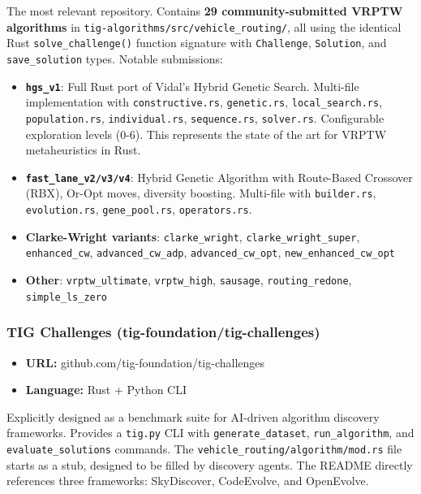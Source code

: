 \documentclass[twocolumn,10pt,letterpaper]{article}
\begin{document}
The most relevant repository. Contains \textbf{29 community-submitted VRPTW algorithms} in \texttt{tig-\allowbreak algorithms/\allowbreak src/\allowbreak vehicle\_routing/\allowbreak }, all using the identical Rust \texttt{solve\_challenge()} function signature with \texttt{Challenge}, \texttt{Solution}, and \texttt{save\_solution} types. Notable submissions:


\begin{itemize}
\setlength{\itemsep}{0pt}
\setlength{\parskip}{0pt}
  \item \textbf{\texttt{hgs\_v1}}: Full Rust port of Vidal's Hybrid Genetic Search. Multi-file implementation with \texttt{constructive.rs}, \texttt{genetic.rs}, \texttt{local\_search.rs}, \texttt{population.rs}, \texttt{individual.rs}, \texttt{sequence.rs}, \texttt{solver.rs}. Configurable exploration levels (0-6). This represents the state of the art for VRPTW metaheuristics in Rust.
  \item \textbf{\texttt{fast\_lane\_v2/\allowbreak v3/\allowbreak v4}}: Hybrid Genetic Algorithm with Route-Based Crossover (RBX), Or-Opt moves, diversity boosting. Multi-file with \texttt{builder.rs}, \texttt{evolution.rs}, \texttt{gene\_pool.rs}, \texttt{operators.rs}.
  \item \textbf{Clarke-Wright variants}: \texttt{clarke\_wright}, \texttt{clarke\_wright\_super}, \texttt{enhanced\_cw}, \texttt{advanced\_cw\_adp}, \texttt{advanced\_cw\_opt}, \texttt{new\_enhanced\_cw\_opt}
  \item \textbf{Other}: \texttt{vrptw\_ultimate}, \texttt{vrptw\_high}, \texttt{sausage}, \texttt{routing\_redone}, \texttt{simple\_ls\_zero}
\end{itemize}

\subsubsection{TIG Challenges (tig-foundation/tig-challenges)}

\begin{itemize}
\setlength{\itemsep}{0pt}
\setlength{\parskip}{0pt}
  \item \textbf{URL:} github.com/tig-foundation/tig-challenges
  \item \textbf{Language:} Rust + Python CLI
\end{itemize}

Explicitly designed as a benchmark suite for AI-driven algorithm discovery frameworks. Provides a \texttt{tig.py} CLI with \texttt{generate\_dataset}, \texttt{run\_algorithm}, and \texttt{evaluate\_solutions} commands. The \texttt{vehicle\_routing/\allowbreak algorithm/\allowbreak mod.rs} file starts as a stub, designed to be filled by discovery agents. The README directly references three frameworks: SkyDiscover, CodeEvolve, and OpenEvolve.
\end{document}
